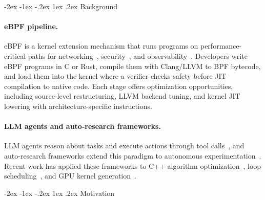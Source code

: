 \documentclass[sigplan,10pt,anonymous,nonacm]{acmart}
\makeatletter
\renewcommand\section{\@startsection{section}{1}{\z@}%
  {-2ex \@plus -1ex \@minus -.2ex}%
  {1ex \@plus .2ex}%
  {\normalfont\Large\bfseries}}
\makeatother
\begin{document}
\maketitle
\pagestyle{plain}

\section{Background}

\paragraph{eBPF pipeline.}
eBPF is a kernel extension mechanism that runs programs on performance-critical paths for networking~\cite{cilium}, security~\cite{tetragon,falco}, and observability~\cite{bcc}.
Developers write eBPF programs in C or Rust, compile them with Clang/LLVM to BPF bytecode, and load them into the kernel where a verifier checks safety before JIT compilation to native code.
Each stage offers optimization opportunities, including source-level restructuring, LLVM backend tuning, and kernel JIT lowering with architecture-specific instructions.

\paragraph{LLM agents and auto-research frameworks.}
LLM agents reason about tasks and execute actions through tool calls~\cite{swebench2024,llmagentsesurvey2025}, and auto-research frameworks extend this paradigm to autonomous experimentation~\cite{gso2025,aiscientistv2,autoresearchvision,aiscientistsurvey,evoscientist,mlrcopilot,agentrxiv,researchgym}.
Recent work has applied these frameworks to C++ algorithm optimization~\cite{pie2024}, loop scheduling~\cite{compilot2025,awarecompiler2025}, and GPU kernel generation~\cite{kernelbench2025,gso2025}.

\section{Motivation}
\end{document}
